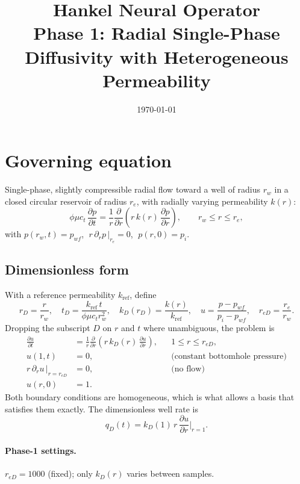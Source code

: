 \documentclass[11pt]{article}
\title{Hankel Neural Operator\\ \large Phase 1: Radial Single-Phase Diffusivity with Heterogeneous Permeability}
\date{\today}
\newcommand{\reD}{r_{eD}}
\begin{document}
\maketitle

\section{Governing equation}

Single-phase, slightly compressible radial flow toward a well of radius $r_w$ in a closed
circular reservoir of radius $r_e$, with radially varying permeability $k(r)$:
\begin{equation}
  \phi\mu c_t\,\frac{\partial p}{\partial t}
  = \frac{1}{r}\frac{\partial}{\partial r}\!\left( r\,k(r)\,\frac{\partial p}{\partial r}\right),
  \qquad r_w \le r \le r_e,
\end{equation}
with $p(r_w,t)=p_{wf}$, $\; r\,\partial_r p\,|_{r_e}=0$, $\; p(r,0)=p_i$.

\subsection{Dimensionless form}
With a reference permeability $k_{\mathrm{ref}}$, define
\begin{equation}
  r_D=\frac{r}{r_w},\quad
  t_D=\frac{k_{\mathrm{ref}}\,t}{\phi\mu c_t r_w^2},\quad
  k_D(r_D)=\frac{k(r)}{k_{\mathrm{ref}}},\quad
  u=\frac{p-p_{wf}}{p_i-p_{wf}},\quad
  \reD=\frac{r_e}{r_w}.
\end{equation}
Dropping the subscript $D$ on $r$ and $t$ where unambiguous, the problem is
\begin{align}
  \frac{\partial u}{\partial t} &= \frac{1}{r}\frac{\partial}{\partial r}\!\left( r\,k_D(r)\,\frac{\partial u}{\partial r}\right), && 1\le r\le \reD, \label{eq:pde}\\
  u(1,t) &= 0, && \text{(constant bottomhole pressure)}\\
  r\,\partial_r u\,\big|_{r=\reD} &= 0, && \text{(no flow)}\\
  u(r,0) &= 1. &&
\end{align}
Both boundary conditions are homogeneous, which is what allows a basis that satisfies them exactly.
The dimensionless well rate is
\begin{equation}
  q_D(t) = k_D(1)\, r\,\frac{\partial u}{\partial r}\Big|_{r=1}.
\end{equation}

\paragraph{Phase-1 settings.} $\reD = 1000$ (fixed); only $k_D(r)$ varies between samples.
\end{document}
